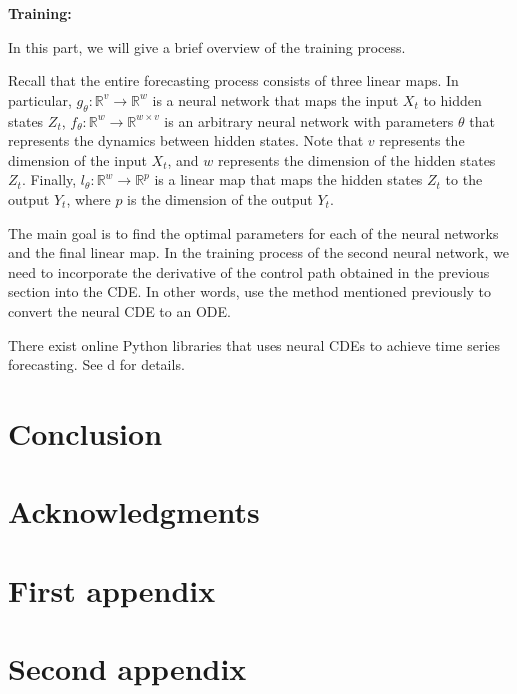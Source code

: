 \documentclass[a4paper,11pt,titlepage]{article}
\theoremstyle{definition}
\theoremstyle{plain}
\theoremstyle{remark}
\begin{document}
\textbf{Training:}

In this part, we will give a brief overview of the training process.

Recall that the entire forecasting process consists of three linear maps. In particular, $g_\theta:\mathbb{R}^v\rightarrow\mathbb{R}^w$ is a neural network that maps the input $X_t$ to hidden states $Z_t$, $f_\theta:\mathbb{R}^w\rightarrow\mathbb{R}^{w\times v}$ is an arbitrary neural network with parameters $\theta$ that represents the dynamics between hidden states. Note that $v$ represents the dimension of the input $X_t$, and $w$ represents the dimension of the hidden states $Z_t$. Finally, $l_\theta:\mathbb{R}^w\rightarrow\mathbb{R}^p$ is a linear map that maps the hidden states $Z_t$ to the output $Y_t$, where $p$ is the dimension of the output $Y_t$.

The main goal is to find the optimal parameters for each of the neural networks and the final linear map. In the training process of the second neural network, we need to incorporate the derivative of the control path obtained in the previous section into the CDE. In other words, use the method mentioned previously to convert the neural CDE to an ODE.

There exist online Python libraries that uses neural CDEs to achieve time series forecasting. See d for details.

\pagebreak
\section{Conclusion}

\section*{Acknowledgments}

\appendix

\pagebreak
\section{First appendix}

\pagebreak
\section{Second appendix}

\pagebreak

\end{document}
